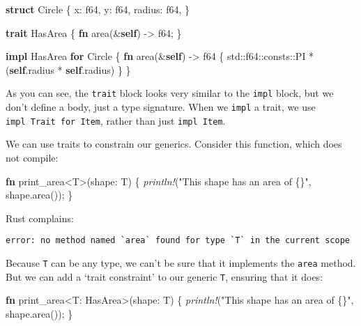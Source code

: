 \documentclass[a4paper,]{book}
\newenvironment{Shaded}{\begin{snugshade}}{\end{snugshade}}
\newcommand{\KeywordTok}[1]{\textcolor[rgb]{0.13,0.29,0.53}{\textbf{{#1}}}}
\newcommand{\DataTypeTok}[1]{\textcolor[rgb]{0.13,0.29,0.53}{{#1}}}
\newcommand{\StringTok}[1]{\textcolor[rgb]{0.31,0.60,0.02}{{#1}}}
\newcommand{\PreprocessorTok}[1]{\textcolor[rgb]{0.56,0.35,0.01}{\textit{{#1}}}}
\newcommand{\NormalTok}[1]{{#1}}
\begin{document}
\begin{Shaded}
\begin{Highlighting}[]
\KeywordTok{struct} \NormalTok{Circle \{}
    \NormalTok{x: }\DataTypeTok{f64}\NormalTok{,}
    \NormalTok{y: }\DataTypeTok{f64}\NormalTok{,}
    \NormalTok{radius: }\DataTypeTok{f64}\NormalTok{,}
\NormalTok{\}}

\KeywordTok{trait} \NormalTok{HasArea \{}
    \KeywordTok{fn} \NormalTok{area(&}\KeywordTok{self}\NormalTok{) -> }\DataTypeTok{f64}\NormalTok{;}
\NormalTok{\}}

\KeywordTok{impl} \NormalTok{HasArea }\KeywordTok{for} \NormalTok{Circle \{}
    \KeywordTok{fn} \NormalTok{area(&}\KeywordTok{self}\NormalTok{) -> }\DataTypeTok{f64} \NormalTok{\{}
        \NormalTok{std::}\DataTypeTok{f64}\NormalTok{::consts::PI * (}\KeywordTok{self}\NormalTok{.radius * }\KeywordTok{self}\NormalTok{.radius)}
    \NormalTok{\}}
\NormalTok{\}}
\end{Highlighting}
\end{Shaded}

As you can see, the \texttt{trait} block looks very similar to the
\texttt{impl} block, but we don't define a body, just a type signature.
When we \texttt{impl} a trait, we use \texttt{impl\ Trait\ for\ Item},
rather than just \texttt{impl\ Item}.

We can use traits to constrain our generics. Consider this function,
which does not compile:

\begin{Shaded}
\begin{Highlighting}[]
\KeywordTok{fn} \NormalTok{print_area<T>(shape: T) \{}
    \PreprocessorTok{println!}\NormalTok{(}\StringTok{"This shape has an area of \{\}"}\NormalTok{, shape.area());}
\NormalTok{\}}
\end{Highlighting}
\end{Shaded}

Rust complains:

\begin{verbatim}
error: no method named `area` found for type `T` in the current scope
\end{verbatim}

Because \texttt{T} can be any type, we can't be sure that it implements
the \texttt{area} method. But we can add a `trait constraint' to our
generic \texttt{T}, ensuring that it does:

\begin{Shaded}
\begin{Highlighting}[]
\KeywordTok{fn} \NormalTok{print_area<T: HasArea>(shape: T) \{}
    \PreprocessorTok{println!}\NormalTok{(}\StringTok{"This shape has an area of \{\}"}\NormalTok{, shape.area());}
\NormalTok{\}}
\end{Highlighting}
\end{Shaded}
\end{document}
